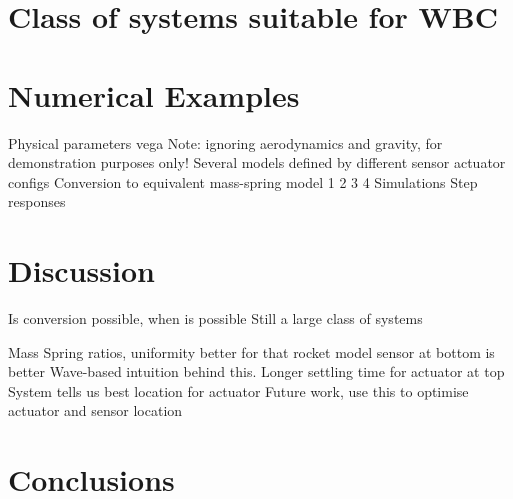 \documentclass{mbd_fullpaper}
\begin{document}
\section{Class of systems suitable for WBC}

\section{Numerical Examples}
Physical parameters vega
Note: ignoring aerodynamics and gravity, for demonstration purposes only!
Several models defined by different sensor actuator configs
Conversion to equivalent mass-spring model
1
2
3
4
Simulations
Step responses

\section{Discussion}
Is conversion possible, when is possible
Still a large class of systems

Mass Spring ratios, uniformity better
for that rocket model sensor at bottom is better
Wave-based intuition behind this. Longer settling time for actuator at top
System tells us best location for actuator
Future work, use this to optimise actuator and sensor location

\section{Conclusions}




\end{document}
